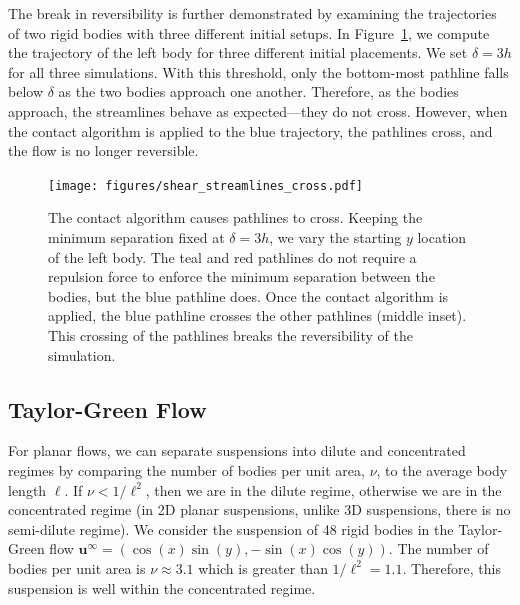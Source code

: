 \documentclass[AMA,STIX1COL]{WileyNJD-v2}
\begin{document}
The break in reversibility is further demonstrated by examining
the trajectories of two rigid bodies with three different initial
setups.  In Figure~\ref{fig:shear_cross}, we compute the
trajectory of the left body for three different initial placements.  We
set $\delta=3h$ for all three simulations.  With this threshold, only
the bottom-most pathline falls below $\delta$ as the two bodies approach
one another.  Therefore, as the bodies approach, the streamlines behave
as expected---they do not cross.  However, when the contact algorithm is
applied to the blue trajectory, the pathlines cross, and the flow is no
longer reversible.

\begin{figure}[t]
\centerline{\texttt{[image: figures/shear\_streamlines\_cross.pdf]}}
\caption{\label{fig:shear_cross} The contact algorithm causes pathlines
to cross. Keeping the minimum separation fixed at $\delta=3h$, we vary
the starting $y$ location of the left body. The teal and red pathlines
do not require a repulsion force to enforce the minimum separation
between the bodies, but the blue pathline does.  Once the contact
algorithm is applied, the blue pathline crosses the other pathlines
(middle inset). This crossing of the pathlines breaks the reversibility
of the simulation.}
\end{figure}


\subsection{Taylor-Green Flow}\label{sec:taylor_green}

For planar flows, we can separate suspensions into dilute and
concentrated regimes by comparing the number of bodies per unit area,
$\nu$, to the average body length $\ell$. If $\nu < 1/\ell^2$, then we
are in the dilute regime, otherwise we are in the concentrated regime
(in 2D planar suspensions, unlike 3D suspensions, there is no
semi-dilute regime).  We consider the suspension of 48 rigid bodies in
the Taylor-Green flow $\mathbf{u}^\infty = (\cos(x)\sin(y),
-\sin(x)\cos(y))$.  The number of bodies per unit area is $\nu \approx
3.1$ which is greater than $1/\ell^2=1.1$.  Therefore, this suspension
is well within the concentrated regime. 
\end{document}
